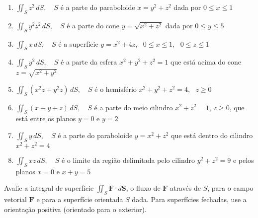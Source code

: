 \documentclass[a4paper, 12pt]{article}
\begin{document}
\begin{enumerate}
		\item $\displaystyle \iint_S z^2 \, dS, \quad S$ é a parte do paraboloide $x = y^2 + z^2$ dada por $0 \leq x \leq 1$

		\item $\displaystyle \iint_S y^{2}z^{2} \, dS, \quad S$ é a parte do cone $y = \sqrt{x^2 + z^2}$ dada por $0 \leq y \leq 5$

		\item $\displaystyle \iint_S x \, dS, \quad S$ é a superfície $y = x^2 + 4z$, \, $0 \leq x \leq 1$, \, $0 \leq z \leq 1$

		\item $\displaystyle \iint_S y^{2} \, dS, \quad S$ é a parte da esfera $x^2 + y^2 + z^2 = 1$ que está acima do cone $z = \sqrt{x^2 + y^2}$

		\item $\displaystyle \iint_S (x^{2}z + y^{2}z) \, dS, \quad S$ é o hemisfério $x^2 + y^2 + z^2 = 4$, \, $z \geq 0$
		\resposta{$16\pi$}

		\item $\displaystyle \iint_S (x + y + z) \, dS, \quad S$ é a parte do meio cilindro $x^2 + z^2 = 1$, $z \geq 0$, que está entre os planos $y = 0$ e $y = 2$

		\item $\displaystyle \iint_S y \, dS, \quad S$ é a parte do paraboloide $y = x^2 + z^2$ que está dentro do cilindro $x^2 + z^2 = 4$
		\resposta{\fazer}

		\item $\displaystyle \iint_S xz \, dS, \quad S$ é o limite da região delimitada pelo cilindro $y^2 + z^2 = 9$ e pelos planos $x = 0$ e $x + y = 5$
		\resposta{\fazer}
	
	\end{enumerate}
	
	\vspace{5mm}
	
	Avalie a integral de superfície $\displaystyle \iint_S \textbf{F} \cdot d\textbf{S}$, o fluxo de $\textbf{F}$ através de $S$, para o campo vetorial $\textbf{F}$ e para a superfície orientada $S$ dada. Para superfícies fechadas, use a orientação positiva (orientado para o exterior).
	
\end{document}
